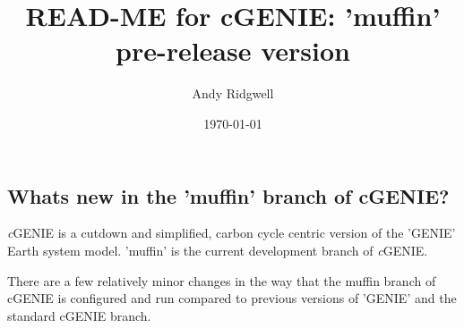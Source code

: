 \documentclass[10pt,twoside]{article}
\title{READ-ME for cGENIE: 'muffin' pre-release version}
\author{Andy Ridgwell}
\date{\today}
\begin{document}

\maketitle







\subsection{Whats new in the 'muffin' branch of cGENIE?}


\textit{c}GENIE is a cutdown and simplified, carbon cycle centric version of the 'GENIE' Earth system model. 'muffin' is the current development branch of \textit{c}GENIE.

There are a few relatively minor changes in the way that the muffin branch of cGENIE is configured and run compared to previous versions of 'GENIE' and the standard cGENIE branch.
\end{document}
